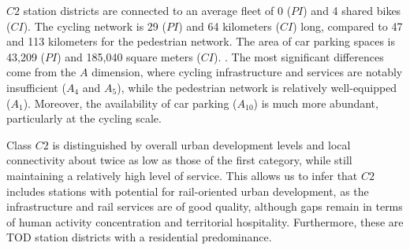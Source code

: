 \begin{refsegment}
\begin{customitemize}
{        \(C2\) station districts are connected to an average fleet of 0 (\(PI\)) and 4 shared bikes (\(CI\)). The cycling network is 29 (\(PI\)) and 64 kilometers (\(CI\)) long, compared to 47 and 113 kilometers for the pedestrian network. The area of car parking spaces is 43,209 (\(PI\)) and 185,040 square meters (\(CI\)).
    }. The most significant differences come from the \(A\) dimension, where cycling infrastructure and services are notably insufficient (\(A_{4}\) and \(A_{5}\)), while the pedestrian network is relatively well-equipped (\(A_{1}\)). Moreover, the availability of car parking (\(A_{10}\)) is much more abundant, particularly at the cycling scale.
\end{customitemize}%

Class \(C2\) is distinguished by overall urban development levels and local connectivity about twice as low as those of the first category, while still maintaining a relatively high level of service. This allows us to infer that \(C2\) includes stations with potential for rail-oriented urban development, as the infrastructure and rail services are of good quality, although gaps remain in terms of human activity concentration and territorial hospitality. Furthermore, these are \acrshort{TOD} station districts with a residential predominance.%


\end{refsegment}
